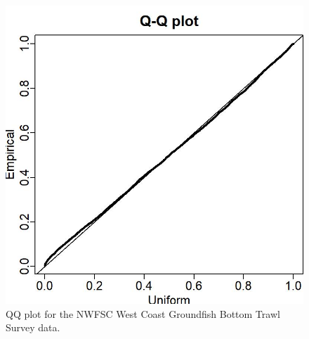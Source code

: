 \documentclass[12pt,]{article}
\begin{document}
\begin{figure}
\centering
\includegraphics{Figures/nwfsc_Posterior_Predictive-Histogram-1.jpg}
\caption{QQ plot for the NWFSC West Coast Groundfish Bottom Trawl Survey
data. \label{fig:nw_qq}}
\end{figure}

\FloatBarrier
\end{document}
